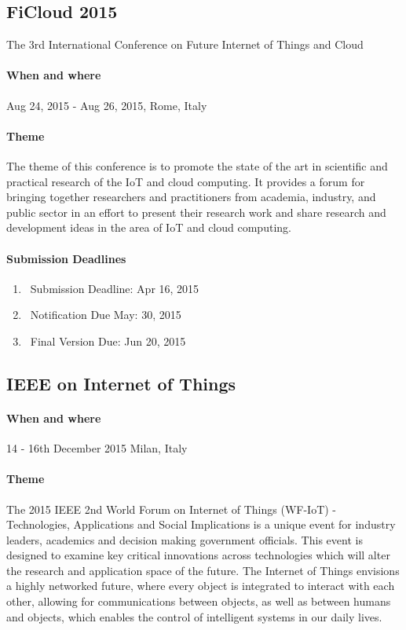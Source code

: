 \documentclass[12pt]{article}
\begin{document}
\subsection{FiCloud 2015 } The 3rd International Conference on Future Internet of Things and Cloud
\paragraph {When and where} Aug 24, 2015 - Aug 26, 2015, Rome, Italy
\paragraph {Theme} The theme of this conference is to promote the state of the art in scientific and practical research of the IoT and cloud computing. It provides a forum for bringing together researchers and practitioners from academia, industry, and public sector in an effort to present their research work and share research and development ideas in the area of IoT and cloud computing. 
\paragraph {Submission Deadlines} 
\begin{enumerate}

\item\ Submission Deadline:	Apr 16, 2015
\item\ Notification Due	May: 30, 2015
\item\ Final Version Due: Jun 20, 2015
\end{enumerate}
\subsection{IEEE on Internet of Things} 
\paragraph {When and where} 14 - 16th December 2015 Milan, Italy
\paragraph {Theme} The 2015 IEEE 2nd World Forum on Internet of Things (WF-IoT) - Technologies, Applications and Social Implications is a unique event for industry leaders, academics and decision making government officials. This event is designed to examine key critical innovations across technologies which will alter the research and application space of the future. The Internet of Things envisions a highly networked future, where every object is integrated to interact with each other, allowing for communications between objects, as well as between humans and objects, which enables the control of intelligent systems in our daily lives.
\end{document}

